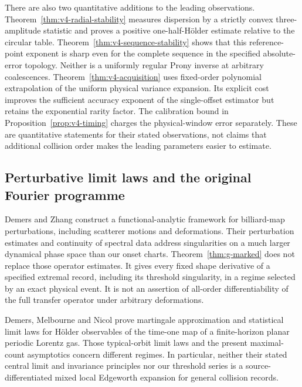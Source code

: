There are also two quantitative additions to the leading observations.
Theorem~\ref{thm:v4-radial-stability} measures dispersion by a strictly
convex three-amplitude statistic and proves a positive one-half-H\"older
estimate relative to the circular table. Theorem~\ref{thm:v4-sequence-stability}
shows that this reference-point exponent is sharp even for the complete
sequence in the specified absolute-error topology. Neither is a
uniformly regular Prony inverse at arbitrary coalescences.
Theorem~\ref{thm:v4-acquisition} uses fixed-order polynomial
extrapolation of the uniform physical variance expansion. Its explicit
cost improves the sufficient accuracy exponent of the single-offset
estimator but retains the exponential rarity factor. The calibration
bound in Proposition~\ref{prop:v4-timing} charges the physical-window
error separately. These are quantitative statements for their stated
observations, not claims that additional collision order makes the
leading parameters easier to estimate.

\subsection{Perturbative limit laws and the original Fourier programme}
Demers and Zhang \cite{DemersZhang} construct a functional-analytic
framework for billiard-map perturbations, including scatterer motions and
deformations. Their perturbation estimates and continuity of spectral
data address singularities on a much larger dynamical phase space than
our onset charts. Theorem~\ref{thm:g-marked} does not replace those operator
estimates. It gives every fixed shape derivative of a specified extremal
record, including its threshold singularity, in a regime selected by an
exact physical event. It is not an assertion of all-order differentiability
of the full transfer operator under arbitrary deformations.

Demers, Melbourne and Nicol \cite{DMN} prove martingale approximation and
statistical limit laws for H\"older observables of the time-one map of a
finite-horizon planar periodic Lorentz gas. Those typical-orbit limit laws
and the present maximal-count asymptotics concern different regimes.
In particular, neither their stated central limit and invariance principles
nor our threshold series is a source-differentiated mixed local Edgeworth
expansion for general collision records.

